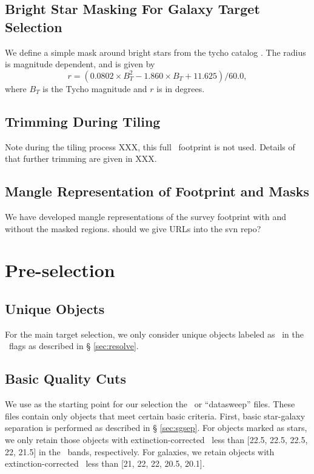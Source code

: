 \documentclass[12pt,preprint]{aastex}
\begin{document}
\subsection{Bright Star Masking For Galaxy Target Selection} \label{sec:tycho}

We define a simple mask around bright stars from the tycho catalog
\citep{tycho2}.  The radius is magnitude dependent, and is given by
\begin{equation}
r = (0.0802\times B_T^2 - 1.860\times B_T + 11.625)/60.0,
\end{equation}
where $B_T$ is the Tycho magnitude and $r$ is in degrees.

\subsection{Trimming During Tiling}

Note during the tiling process XXX, this full \boss\ footprint is not used.
Details of that further trimming are given in XXX.

\subsection{Mangle Representation of Footprint and Masks}

We have developed mangle \citep{SwansonMangle08} representations of
the survey footprint with and without the masked regions.
{\color{red} should we give URLs into the svn repo?}



\section{Pre-selection}

\subsection{Unique Objects}

For the main target selection, we only consider unique objects labeled as
\surveyprimary\ in the \resolveflags\ flags as described in \S
\ref{sec:resolve}.

\subsection{Basic Quality Cuts} \label{sec:basiccuts}

We use as the starting point for our selection the \calibObj\ or ``datasweep''
files.   These files contain only objects that meet certain basic criteria.
First, basic star-galaxy separation is performed as described in \S
\ref{sec:sgsep}.  For objects marked as stars, we only retain those objects
with extinction-corrected \psfmag\ less than [22.5, 22.5, 22.5, 22, 21.5] in
the \allmag\ bands, respectively.  For galaxies, we retain objects with
extinction-corrected \modelmag\ less than [21, 22, 22, 20.5, 20.1].
\end{document}
